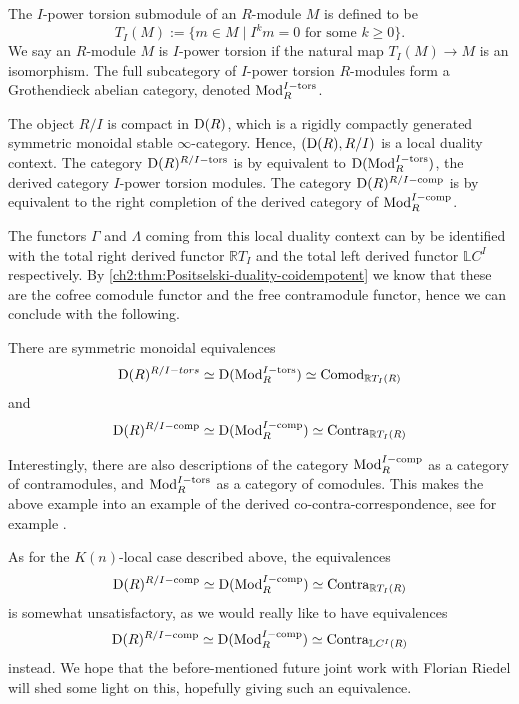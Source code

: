 The $I$-power torsion submodule of an $R$-module $M$ is defined to be 
\[T_I(M) := \{m \in M \mid I^k m = 0 \text{ for some } k\geq 0\}.\]
We say an $R$-module $M$ is $I$-power torsion if the natural map $T_I(M) \to M$ is an isomorphism. The full subcategory of $I$-power torsion $R$-modules form a Grothendieck abelian category, denoted $\mathrm{Mod}_R^{I-\mathrm{tors}}$. 

The object $R/I$ is compact in $\mathrm{D}(R)$, which is a rigidly compactly generated symmetric monoidal stable $\infty$-category. Hence, $(\mathrm{D}(R), R/I)$ is a local duality context. The category $\mathrm{D}(R)^{R/I-\mathrm{tors}}$ is by \cite[3.7(2)]{barthel-heard-valenzuela_2020} equivalent to $\mathrm{D}(\mathrm{Mod}_R^{I-\mathrm{tors}})$, the derived category $I$-power torsion modules. The category $\mathrm{D}(R)^{R/I-\mathrm{comp}}$ is by \cite[3.7(1)]{barthel-heard-valenzuela_2020} equivalent to the right completion of the derived category of $\mathrm{Mod}_R^{I-\mathrm{comp}}$. 

The functors $\Gamma$ and $\Lambda$ coming from this local duality context can by \cite[3.16]{barthel-heard-valenzuela_2018} be identified with the total right derived functor $\mathbb{R}T_I$ and the total left derived functor $\mathbb{L}C^I$ respectively. By \cref{ch2:thm:Positselski-duality-coidempotent} we know that these are the cofree comodule functor and the free contramodule functor, hence we can conclude with the following. 

\begin{proposition}
    There are symmetric monoidal equivalences
    \[\mathrm{D}(R)^{R/I-tors}\simeq \mathrm{D}(\mathrm{Mod}_R^{I-\mathrm{tors}})\simeq \mathrm{Comod}_{\mathbb{R}T_I(R)}\]
    and 
    \[\mathrm{D}(R)^{R/I-\mathrm{comp}}\simeq \mathrm{D}(\mathrm{Mod}_R^{I-\mathrm{comp}})\simeq \mathrm{Contra}_{\mathbb{R}T_I(R)}\]
\end{proposition}

Interestingly, there are also descriptions of the category $\mathrm{Mod}_R^{I-\mathrm{comp}}$ as a category of contramodules, and $\mathrm{Mod}_R^{I-\mathrm{tors}}$ as a category of comodules. This makes the above example into an example of the derived co-contra-correspondence, see for example \cite{positselski_2016}. 

As for the $K(n)$-local case described above, the equivalences
\[\mathrm{D}(R)^{R/I-\mathrm{comp}}\simeq \mathrm{D}(\mathrm{Mod}_R^{I-\mathrm{comp}})\simeq \mathrm{Contra}_{\mathbb{R}T_I(R)}\]
is somewhat unsatisfactory, as we would really like to have equivalences 
\[\mathrm{D}(R)^{R/I-\mathrm{comp}}\simeq \mathrm{D}(\mathrm{Mod}_R^{I-\mathrm{comp}})\simeq \mathrm{Contra}_{\mathbb{L}C^I(R)}\]
instead. We hope that the before-mentioned future joint work with Florian Riedel will shed some light on this, hopefully giving such an equivalence.  